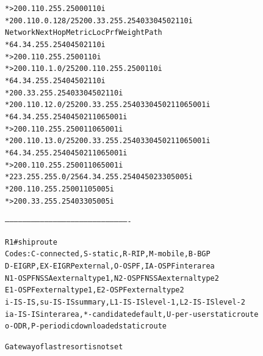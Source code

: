 \documentclass[12pt,twoside,a4paper]{report}
\begin{document}
{\begin{small}
\begin{alltt}
*>                  200.110.255.250          0             0 110 i
*  200.110.0.128/25   200.33.255.254                         0 330 4502 110 i
   Network          Next Hop            Metric LocPrf Weight Path
*                   64.34.255.254                          0 4502 110 i
*>                  200.110.255.250                        0 110 i
*> 200.110.1.0/25   200.110.255.250                        0 110 i
*                   64.34.255.254                          0 4502 110 i
*                   200.33.255.254                         0 330 4502 110 i
*  200.110.12.0/25  200.33.255.254                         0 330 4502 110 65001 i
*                   64.34.255.254                          0 4502 110 65001 i
*>                  200.110.255.250                        0 110 65001 i
*  200.110.13.0/25  200.33.255.254                         0 330 4502 110 65001 i
*                   64.34.255.254                          0 4502 110 65001 i
*>                  200.110.255.250                        0 110 65001 i
*  223.255.255.0/25 64.34.255.254                          0 4502 330 5005 i
*                   200.110.255.250                        0 110 5005 i
*>                  200.33.255.254                         0 330 5005 i


-------------------------------------------------------------------------------------


R1#sh ip route            
Codes: C - connected, S - static, R - RIP, M - mobile, B - BGP
       D - EIGRP, EX - EIGRP external, O - OSPF, IA - OSPF inter area 
       N1 - OSPF NSSA external type 1, N2 - OSPF NSSA external type 2
       E1 - OSPF external type 1, E2 - OSPF external type 2
       i - IS-IS, su - IS-IS summary, L1 - IS-IS level-1, L2 - IS-IS level-2
       ia - IS-IS inter area, * - candidate default, U - per-user static route
       o - ODR, P - periodic downloaded static route

Gateway of last resort is not set


\end{alltt}
\end{small}}
\end{document}
